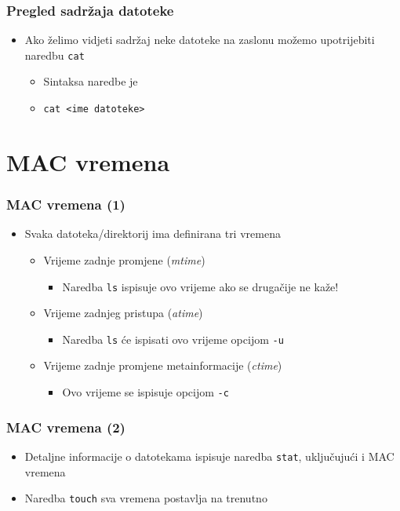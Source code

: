 \documentclass{beamer}
\newcommand{\shell}[1]{\texttt{\small #1}}
\begin{document}
\begin{frame}[t]
\frametitle{Pregled sadržaja datoteke}
\begin{itemize}
  \item Ako želimo vidjeti sadržaj neke datoteke na zaslonu možemo
        upotrijebiti naredbu \shell{cat}
  \begin{itemize}
    \item Sintaksa naredbe je
    \item[] \shell{cat \textless ime datoteke\textgreater}
  \end{itemize}
\end{itemize}
\end{frame}

\section{MAC vremena}
\begin{frame}[t]
\frametitle{MAC vremena (1)}
\begin{itemize}
  \item Svaka datoteka/direktorij ima definirana tri vremena
  \begin{itemize}
    \item Vrijeme zadnje promjene (\emph{mtime})
    \begin{itemize}
      \item Naredba \shell{ls} ispisuje ovo vrijeme ako se drugačije
               ne kaže!
    \end{itemize}
    \item Vrijeme zadnjeg pristupa (\emph{atime})
    \begin{itemize}
      \item Naredba \shell{ls} će ispisati ovo vrijeme opcijom
            \shell{-u}
    \end{itemize}
    \item Vrijeme zadnje promjene metainformacije (\emph{ctime})
    \begin{itemize}
      \item Ovo vrijeme se ispisuje opcijom \shell{-c}
    \end{itemize}
  \end{itemize}
\end{itemize}
\end{frame}

\begin{frame}[t]
\frametitle{MAC vremena (2)}
\begin{itemize}
  \item Detaljne informacije o datotekama ispisuje naredba \shell{stat},
        uključujući i MAC vremena
  \item Naredba \shell{touch} sva vremena postavlja na trenutno
\end{itemize}
\end{frame}
\end{document}

